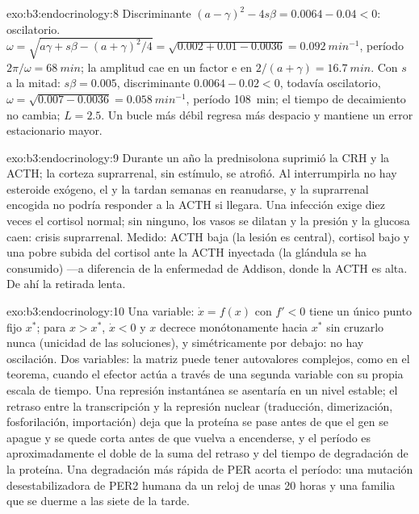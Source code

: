 \begin{solution}{exo:b3:endocrinology:8}
Discriminante $(a - \gamma)^{2} - 4s\beta = 0.0064 - 0.04 < 0$:
oscilatorio. $\omega = \sqrt{a\gamma + s\beta - (a+\gamma)^{2}/4} =
\sqrt{0.002 + 0.01 - 0.0036} = \qty{0.092}{min^{-1}}$, período $2\pi/
\omega = \qty{68}{min}$; la amplitud cae en un factor $\mathrm{e}$ en $2/(a +
\gamma) = \qty{16.7}{min}$. Con $s$ a la mitad: $s\beta = 0.005$,
discriminante $0.0064 - 0.02 < 0$, todavía oscilatorio, $\omega = \sqrt{0.007 - 0.0036}
= \qty{0.058}{min^{-1}}$, período \qty{108}{min}; el tiempo de
decaimiento no cambia; $L = 2.5$. Un bucle más débil regresa más
despacio y mantiene un error estacionario mayor.
\end{solution}

\begin{solution}{exo:b3:endocrinology:9}
Durante un año la prednisolona suprimió la CRH y la ACTH; la corteza
suprarrenal, sin estímulo, se atrofió. Al interrumpirla no hay
esteroide exógeno, el  y la  tardan semanas en
reanudarse, y la suprarrenal encogida no podría responder a la ACTH si
llegara. Una infección exige diez veces el cortisol normal; sin
ninguno, los vasos se dilatan y la presión y la glucosa caen: crisis
suprarrenal. Medido: ACTH baja (la lesión es central), cortisol bajo y
una pobre subida del cortisol ante la ACTH inyectada (la glándula se ha
consumido) ---a diferencia de la enfermedad de Addison, donde la ACTH
es alta. De ahí la retirada lenta.
\end{solution}

\begin{solution}{exo:b3:endocrinology:10}
Una variable: $\dot x = f(x)$ con $f' < 0$ tiene un único punto fijo
$x^{*}$; para $x > x^{*}$, $\dot x < 0$ y $x$ decrece monótonamente
hacia $x^{*}$ sin cruzarlo nunca (unicidad de las soluciones), y
simétricamente por debajo: no hay oscilación. Dos variables: la matriz
puede tener autovalores complejos, como en el teorema, cuando el
efector actúa a través de una segunda variable con su propia escala de
tiempo. Una represión instantánea se asentaría en un nivel estable; el
retraso entre la transcripción y la represión nuclear (traducción,
dimerización, fosforilación, importación) deja que la proteína se pase
antes de que el gen se apague y se quede corta antes de que vuelva a
encenderse, y el período es aproximadamente el doble de la suma del
retraso y del tiempo de degradación de la proteína. Una degradación más
rápida de PER acorta el período: una mutación desestabilizadora de PER2
humana da un reloj de unas 20 horas y una familia que se duerme a las
siete de la tarde.
\end{solution}

